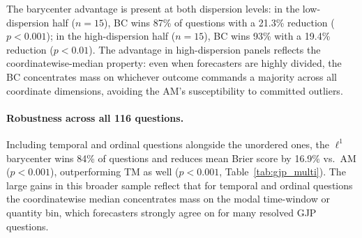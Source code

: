 The barycenter advantage is present at both dispersion levels: in the low-dispersion half ($n=15$), BC wins 87\% of questions with a 21.3\% reduction ($p < 0.001$); in the high-dispersion half ($n=15$), BC wins 93\% with a 19.4\% reduction ($p < 0.01$).  The advantage in high-dispersion panels reflects the coordinatewise-median property: even when forecasters are highly divided, the BC concentrates mass on whichever outcome commands a majority across all coordinate dimensions, avoiding the AM's susceptibility to committed outliers.

\paragraph{Robustness across all 116 questions.}  Including temporal and ordinal questions alongside the unordered ones, the $\ell^1$ barycenter wins 84\% of questions and reduces mean Brier score by 16.9\% vs.\ AM ($p < 0.001$), outperforming TM as well ($p < 0.001$, Table~\ref{tab:gjp_multi}).  The large gains in this broader sample reflect that for temporal and ordinal questions the coordinatewise median concentrates mass on the modal time-window or quantity bin, which forecasters strongly agree on for many resolved GJP questions.

